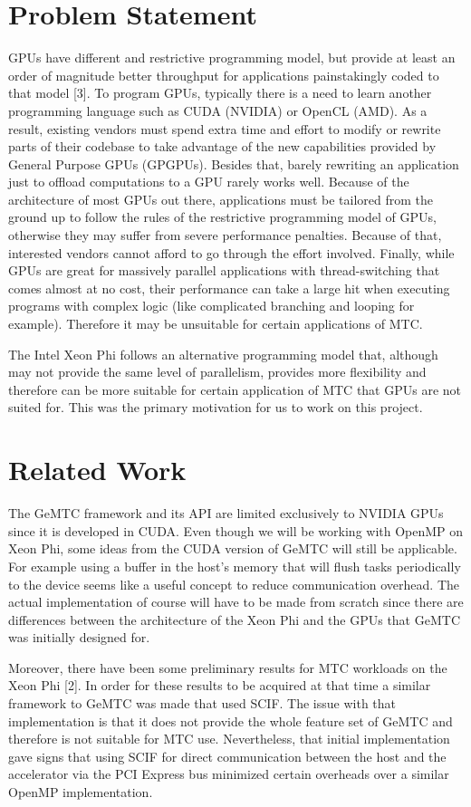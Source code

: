 \documentclass[10pt, conference, compsocconf]{IEEEtran}
\begin{document}
\section{Problem Statement}
GPUs have different and restrictive programming model, but provide at least an order of magnitude better throughput for applications painstakingly coded to that model [3]. To program GPUs, typically there is a need to learn another programming language such as CUDA (NVIDIA) or OpenCL (AMD). As a result, existing vendors must spend extra time and effort to modify or rewrite parts of their codebase to take advantage of the new capabilities provided by General Purpose GPUs (GPGPUs). Besides that, barely rewriting an application just to offload computations to a GPU rarely works well. Because of the architecture of most GPUs out there, applications must be tailored from the ground up to follow the rules of the restrictive programming model of GPUs, otherwise they may suffer from severe performance penalties. Because of that, interested vendors cannot afford to go through the effort involved. Finally, while GPUs are great for massively parallel applications with thread-switching that comes almost at no cost, their performance can take a large hit when executing programs with complex logic (like complicated branching and looping for example). Therefore it may be unsuitable for certain applications of MTC.

The Intel Xeon Phi follows an alternative programming model that, although may not provide the same level of parallelism, provides more flexibility and therefore can be more suitable for certain application of MTC that GPUs are not suited for. This was the primary motivation for us to work on this project.

\section{Related Work}
The GeMTC framework and its API are limited exclusively to NVIDIA GPUs since it is developed in CUDA. Even though we will be working with OpenMP on Xeon Phi, some ideas from the CUDA version of GeMTC will still be applicable. For example using a buffer in the host’s memory that will flush tasks periodically to the device seems like a useful concept to reduce communication overhead. The actual implementation of course will have to be made from scratch since there are differences between the architecture of the Xeon Phi and the GPUs that GeMTC was initially designed for.

Moreover, there have been some preliminary results for MTC workloads on the Xeon Phi [2]. In order for these results to be acquired at that time a similar framework to GeMTC was made that used SCIF. The issue with that implementation is that it does not provide the whole feature set of GeMTC and therefore is not suitable for MTC use. Nevertheless, that initial implementation gave signs that using SCIF for direct communication between the host and the accelerator via the PCI Express bus minimized certain overheads over a similar OpenMP implementation.
\end{document}
